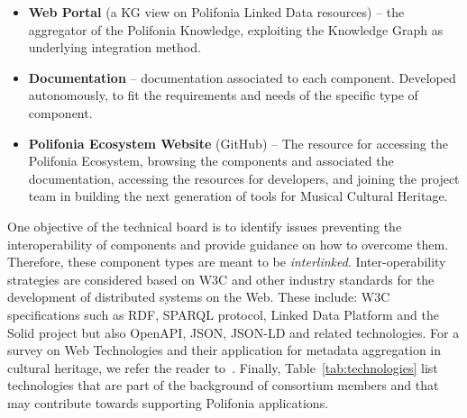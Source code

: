 \begin{itemize}
\item \textbf{Web Portal} (a KG view on Polifonia Linked Data resources) -- the aggregator of the Polifonia Knowledge, exploiting the Knowledge Graph as underlying integration method.
\item \textbf{Documentation} -- documentation associated to each component. Developed autonomously, to fit the requirements and needs of the specific type of component.
\item \textbf{Polifonia Ecosystem Website} (GitHub) -- The resource for accessing the Polifonia Ecosystem, browsing the components and associated the documentation, accessing the resources for developers, and joining the project team in building the next generation of tools for Musical Cultural Heritage.
\end{itemize}



One objective of the technical board is to identify issues preventing the interoperability of components and provide guidance on how to overcome them. Therefore, these component types are meant to be \textit{interlinked}. Inter-operability strategies are considered based on W3C and other industry standards for the development of distributed systems on the Web.
These include: W3C specifications such as RDF, SPARQL protocol, Linked Data Platform and the Solid project but also OpenAPI, JSON, JSON-LD and related technologies.
For a survey on  Web Technologies and their application for metadata aggregation in cultural heritage, we refer the reader to~\cite{freire2017web,daga2021integrating}.
Finally, Table~\ref{tab:technologies} list technologies that are part of the background of consortium members and that may contribute towards supporting Polifonia applications.

%
% 
% 

